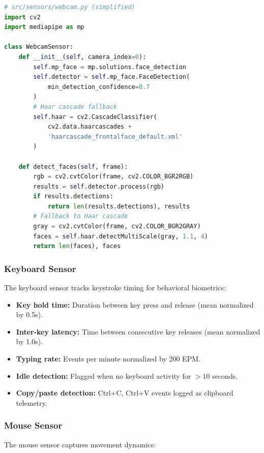 \documentclass{article}
\begin{document}
\begin{lstlisting}[language=Python, caption={Webcam sensor with MediaPipe and fallback}, label={lst:webcam}]
# src/sensors/webcam.py (simplified)
import cv2
import mediapipe as mp

class WebcamSensor:
    def __init__(self, camera_index=0):
        self.mp_face = mp.solutions.face_detection
        self.detector = self.mp_face.FaceDetection(
            min_detection_confidence=0.7
        )
        # Haar cascade fallback
        self.haar = cv2.CascadeClassifier(
            cv2.data.haarcascades +
            'haarcascade_frontalface_default.xml'
        )

    def detect_faces(self, frame):
        rgb = cv2.cvtColor(frame, cv2.COLOR_BGR2RGB)
        results = self.detector.process(rgb)
        if results.detections:
            return len(results.detections), results
        # Fallback to Haar cascade
        gray = cv2.cvtColor(frame, cv2.COLOR_BGR2GRAY)
        faces = self.haar.detectMultiScale(gray, 1.1, 4)
        return len(faces), faces
\end{lstlisting}

\subsubsection{Keyboard Sensor}

The keyboard sensor tracks keystroke timing for behavioral biometrics:

\begin{itemize}
    \item \textbf{Key hold time:} Duration between key press and release (mean normalized by 0.5s).
    \item \textbf{Inter-key latency:} Time between consecutive key releases (mean normalized by 1.0s).
    \item \textbf{Typing rate:} Events per minute normalized by 200 EPM.
    \item \textbf{Idle detection:} Flagged when no keyboard activity for $>10$ seconds.
    \item \textbf{Copy/paste detection:} Ctrl+C, Ctrl+V events logged as clipboard telemetry.
\end{itemize}

\subsubsection{Mouse Sensor}

The mouse sensor captures movement dynamics:
\end{document}
